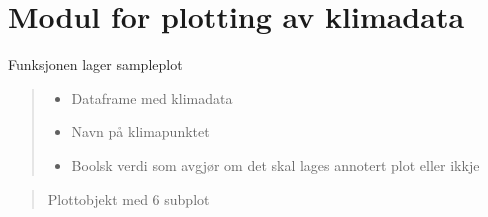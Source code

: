 \documentclass[letterpaper,10pt,norsk]{sphinxmanual}
\begin{document}
\chapter{Modul for plotting av klimadata}
\label{\detokenize{index:module-klimadata.plot}}\label{\detokenize{index:modul-for-plotting-av-klimadata}}

\begin{fulllineitems}
\label{\detokenize{index:klimadata.plot.klima_sno_oversikt}}
\pysigstartsignatures
{}
\pysigstopsignatures
\sphinxAtStartPar
Funksjonen lager sampleplot
\begin{quote}\begin{description}
\begin{itemize}
\item {} 
\sphinxAtStartPar
{} \textendash{} Dataframe med klimadata

\item {} 
\sphinxAtStartPar
{} \textendash{} Navn på klimapunktet

\item {} 
\sphinxAtStartPar
{} \textendash{} Boolsk verdi som avgjør om det skal lages annotert plot eller ikkje

\end{itemize}

\end{description}\end{quote}
\begin{description}
\begin{quote}
\begin{description}
\sphinxAtStartPar
Plott\sphinxhyphen{}objekt med 6 subplot

\end{description}
\end{quote}

\end{description}

\end{fulllineitems}
\end{document}
